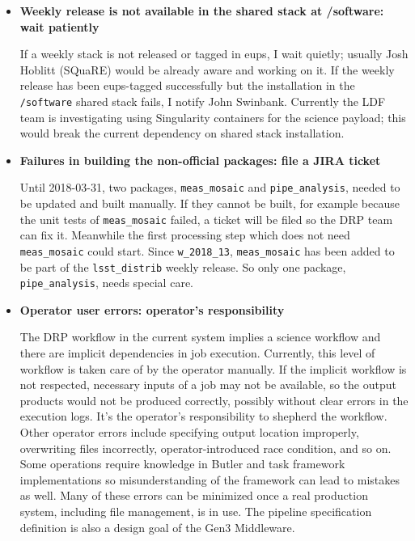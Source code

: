 \documentclass[DM,authoryear,toc]{lsstdoc}
\begin{document}
\begin{itemize}
  \item \textbf{Weekly release is not available in the shared stack
  at /software: wait patiently}

  If a weekly stack is not released or tagged in eups, I wait
  quietly; usually Josh Hoblitt (SQuaRE) would be already aware and
  working on it. If the weekly release has been eups-tagged
  successfully but the installation in the \texttt{/software} shared stack
  fails, I notify John Swinbank.  Currently the LDF team is investigating
  using Singularity containers for the science payload; this would
  break the current dependency on shared stack installation.

  \item \textbf{Failures in building the non-official packages:
  file a JIRA ticket}

  Until 2018-03-31, two packages, \texttt{meas\_mosaic} and
  \texttt{pipe\_analysis},
  needed to be updated and built manually. If they cannot be built,
  for example because the unit tests of \texttt{meas\_mosaic} failed, a
  ticket will be filed so the DRP team can fix it. Meanwhile the first
  processing step which does not need \texttt{meas\_mosaic} could start. Since
  \texttt{w\_2018\_13}, \texttt{meas\_mosaic} has been added to be part of the
  \texttt{lsst\_distrib} weekly release.  So only one package,
  \texttt{pipe\_analysis}, needs special care.

  \item \textbf{Operator user errors: operator’s responsibility}

  The DRP workflow in the current system implies a science workflow
  and there are implicit dependencies in job execution. Currently,
  this level of workflow is taken care of by the operator manually.
  If the implicit workflow is not respected, necessary inputs of a
  job may not be available, so the output products would not be
  produced correctly, possibly without clear errors in the execution
  logs. It’s the operator’s responsibility to shepherd the workflow.
  Other operator errors include specifying output location improperly,
  overwriting files incorrectly, operator-introduced race condition,
  and so on. Some operations require knowledge in Butler and task
  framework implementations so  misunderstanding of the framework
  can lead to mistakes as well. Many of these errors can be minimized
  once a real production system, including file management, is in
  use. The pipeline specification definition is also a design goal
  of the Gen3 Middleware.


\end{itemize}
\end{document}
